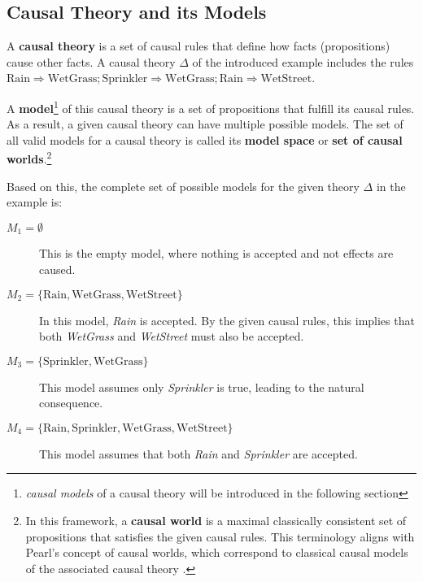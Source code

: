 \documentclass[seminar,palatino,english]{AIGpaper}
\begin{document}
\subsection{Causal Theory and its Models}

A \textbf{causal theory} is a set of causal rules that define how facts (propositions) cause other facts. A causal theory $ \Delta $ of the introduced example includes the rules $ \text{Rain} \Rightarrow \text{WetGrass}; \text{Sprinkler} \Rightarrow \text{WetGrass}; \text{Rain} \Rightarrow \text{WetStreet} $.

A \textbf{model}\footnote{\emph{causal models} of a causal theory will be introduced in the following section} of this causal theory is a set of propositions that fulfill its causal rules. As a result, a given causal theory can have multiple possible models. The set of all valid models for a causal theory is called its \textbf{model space} or \textbf{set of causal worlds}.\footnote{In this framework, a \textbf{causal world} is a \glqq{}maximal classically consistent set of propositions\grqq{}\cite{bochman_causal_2024} that satisfies the given causal rules. This terminology aligns with Pearl’s concept of causal worlds, which correspond to classical causal models of the associated causal theory \cite{bochman_causal_2024}.}

Based on this, the complete set of possible models for the given theory $ \Delta $ in the example is:

\begin{description}
    \item[$ M_1 = \emptyset $] This is the empty model, where nothing is accepted and not effects are caused.
    
    \item[$ M_2 = \{ \text{Rain}, \text{WetGrass}, \text{WetStreet} \} $] In this model, \textit{Rain} is accepted. By the given causal rules, this implies that both \textit{WetGrass} and \textit{WetStreet} must also be accepted.
    
    \item[$ M_3 = \{ \text{Sprinkler}, \text{WetGrass} \} $] This model assumes only \emph{Sprinkler} is true, leading to the natural consequence.
    
    \item[$ M_4 = \{ \text{Rain}, \text{Sprinkler}, \text{WetGrass}, \text{WetStreet} \} $] This model assumes that both \textit{Rain} and \textit{Sprinkler} are accepted.
\end{description}
\end{document}
